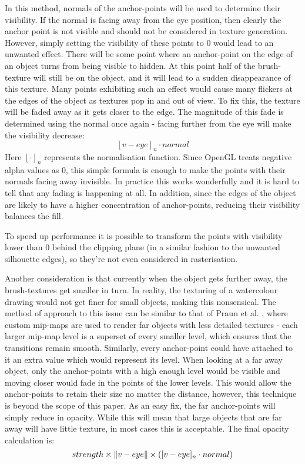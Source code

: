 \documentclass[a4paper,10pt]{article}
\DeclarePairedDelimiter{\norm}{\lVert}{\rVert}
\begin{document}
In this method, normals of the anchor-points will be used to determine their visibility. If the normal is facing away from the eye position, then clearly the anchor point is not visible and should not be considered in texture generation. However, simply setting the visibility of these points to 0 would lead to an unwanted effect. There will be some point where an anchor-point on the edge of an object turns from being visible to hidden. At this point half of the brush-texture will still be on the object, and it will lead to a sudden disappearance of this texture. Many points exhibiting such an effect would cause many flickers at the edges of the object as textures pop in and out of view. To fix this, the texture will be faded away as it gets closer to the edge. The magnitude of this fade is determined using the normal once again - facing further from the eye will make the visibility decrease:
$$[v-eye]_n \cdot normal$$
Here $[\cdot]_n$ represents the normalisation function. Since OpenGL treats negative alpha values as 0, this simple formula is enough to make the points with their normals facing away invisible. In practice this works wonderfully and it is hard to tell that any fading is happening at all. In addition, since the edges of the object are likely to have a higher concentration of anchor-points, reducing their visibility balances the fill.

To speed up performance it is possible to transform the points with visibility lower than 0 behind the clipping plane (in a similar fashion to the unwanted silhouette edges), so they're not even considered in rasterisation.

Another consideration is that currently when the object gets further away, the brush-textures get smaller in turn. In reality, the texturing of a watercolour drawing would not get finer for small objects, making this nonsensical. The method of approach to this issue can be similar to that of Praun et al. \cite{Praun2001}, where custom mip-maps are used to render far objects with less detailed textures - each larger mip-map level is a superset of every smaller level, which ensures that the transitions remain smooth. Similarly, every anchor-point could have attached to it an extra value which would represent its level. When looking at a far away object, only the anchor-points with a high enough level would be visible and moving closer would fade in the points of the lower levels. This would allow the anchor-points to retain their size no matter the distance, however, this technique is beyond the scope of this paper. As an easy fix, the far anchor-points will simply reduce in opacity. While this will mean that large objects that are far away will have little texture, in most cases this is acceptable. The final opacity calculation is:
$$strength \times \norm{v-eye} \times ([v-eye]_n \cdot normal)$$
\end{document}
